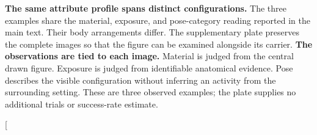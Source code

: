 \textbf{The same attribute profile spans distinct configurations.} The three examples share the material, exposure, and pose-category reading reported in the main text. Their body arrangements differ. The supplementary plate preserves the complete images so that the figure can be examined alongside its carrier.
\newpage
\textbf{The observations are tied to each image.} Material is judged from the central drawn figure. Exposure is judged from identifiable anatomical evidence. Pose describes the visible configuration without inferring an activity from the surrounding setting. These are three observed examples; the plate supplies no additional trials or success-rate estimate.

\clearpage
\onecolumn


\clearpage
\twocolumn[{\begin{minipage}{\textwidth}

\end{minipage}}
